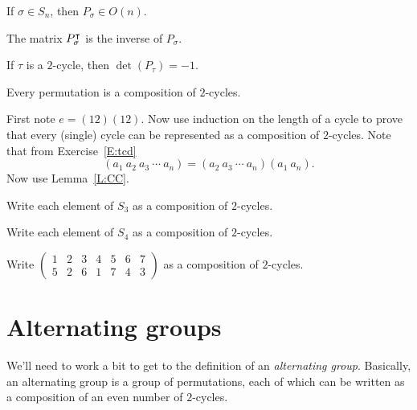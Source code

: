 \documentclass{ximera}
\begin{document}
\begin{lemma}
  If $\sigma \in S_n$, then $P_\sigma \in O(n)$.
  \begin{sketch}
    The matrix $P_\sigma^\intercal$ is the inverse of $P_\sigma$.
  \end{sketch}
\end{lemma}

\begin{corollary}
  If $\tau$ is a $2$-cycle, then $\det(P_\tau) = -1$.
\end{corollary}





\begin{lemma}\label{L:td}
  Every permutation is a composition of $2$-cycles.
  \begin{sketch}
    First note $e = (12)(12)$. Now use induction on the length of a
    cycle to prove that every (single) cycle can be represented as a
    composition of $2$-cycles. Note that from Exercise~\ref{E:tcd}
    \[
    (a_1 \ a_2 \ a_3 \ \cdots \ a_{n}) = (a_2 \ a_3 \ \cdots \ a_n) (a_1 \ a_{n}). 
    \]
    Now use Lemma~\ref{L:CC}.
  \end{sketch}
\end{lemma}


\begin{exercise}
  Write each element of $S_3$ as a composition of $2$-cycles.
\end{exercise}

\begin{exercise}
  Write each element of $S_4$ as a composition of $2$-cycles.
\end{exercise}

\begin{exercise}
  Write $\left(\begin{smallmatrix}
    1 & 2 & 3 & 4 & 5 & 6 & 7 \\
    5 & 2 & 6 & 1 & 7 & 4 & 3
  \end{smallmatrix}\right)$ as a composition of $2$-cycles.
\end{exercise}



\section{Alternating groups}


We'll need to work a bit to get to the definition of an
\textit{alternating group}. Basically, an alternating group is a group
of permutations, each of which can be written as a composition of an
even number of $2$-cycles.
\end{document}
